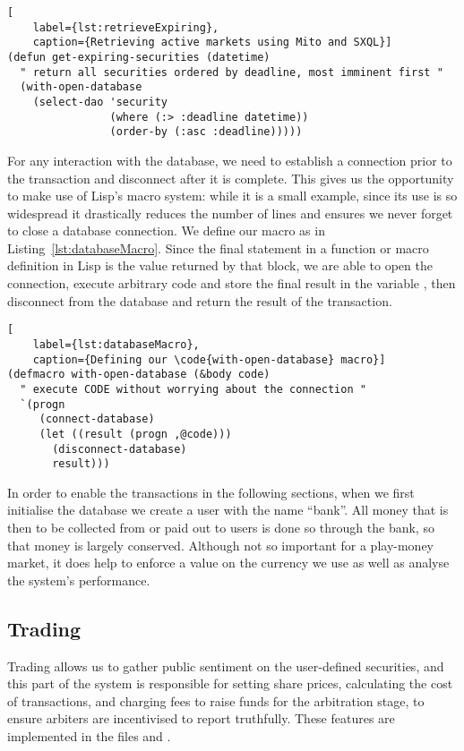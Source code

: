 \begin{lstlisting}[
	label={lst:retrieveExpiring},
	caption={Retrieving active markets using Mito and SXQL}]
(defun get-expiring-securities (datetime)
  " return all securities ordered by deadline, most imminent first "
  (with-open-database
    (select-dao 'security
                (where (:> :deadline datetime))
                (order-by (:asc :deadline)))))
\end{lstlisting}

For any interaction with the database, we need to establish a connection prior
to the transaction and disconnect after it is complete. This gives us the
opportunity to make use of Lisp's macro system: while it is a small example,
since its use is so widespread it drastically reduces the number of lines and
ensures we never forget to close a database connection. We define our macro
 as in Listing~\ref{lst:databaseMacro}. Since the
final statement in a function or macro definition in Lisp is the value returned
by that block, we are able to open the connection, execute arbitrary code and
store the final result in the variable , then disconnect from the
database and return the result of the transaction.

\begin{lstlisting}[
	label={lst:databaseMacro},
	caption={Defining our \code{with-open-database} macro}]
(defmacro with-open-database (&body code)
  " execute CODE without worrying about the connection "
  `(progn
     (connect-database)
     (let ((result (progn ,@code)))
       (disconnect-database)
       result)))
\end{lstlisting}

In order to enable the transactions in the following sections, when we first
initialise the database we create a user with the name ``bank''. All money that
is then to be collected from or paid out to users is done so through the bank,
so that money is largely conserved. Although not so important for a play-money
market, it does help to enforce a value on the currency we use as well as
analyse the system's performance.

\subsection{Trading}

\label{sec:trading}

Trading allows us to gather public sentiment on the user-defined securities,
and this part of the system is responsible for setting share prices,
calculating the cost of transactions, and charging fees to raise funds for the
arbitration stage, to ensure arbiters are incentivised to report truthfully.
These features are implemented in the files  and
.

